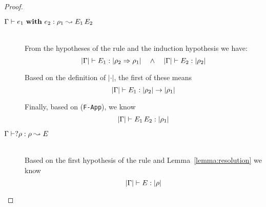 \begin{proof}
\begin{description}
\item[\quad$\Gamma \vdash e_1 {\bf ~with~} e_2 : \rho_1 \leadsto E_1\,E_2$] \ \\

  From the hypotheses of the rule and the induction hypothesis we have:
\begin{equation*}
    |\Gamma| \vdash E_1 : |\rho_2 \Rightarrow \rho_1| \quad\wedge\quad |\Gamma| \vdash E_2 : |\rho_2|
\end{equation*}

  Based on the definition of $|\cdot|$, the first of these means 
\begin{equation*}
    |\Gamma| \vdash E_1 : |\rho_2| \rightarrow |\rho_1|
\end{equation*}

  Finally, based on (\texttt{F-App}), we know
\begin{equation*}
    |\Gamma| \vdash E_1\,E_2 : |\rho_1|
\end{equation*}

\item[\quad$\Gamma \vdash ?\rho : \rho \leadsto E$] \ \\

  Based on the first hypothesis of the rule and Lemma~\ref{lemma:resolution} we know
\begin{equation*} 
    |\Gamma| \vdash E : |\rho|
\end{equation*} 

\end{description}
\end{proof}

{\centering
{}}

